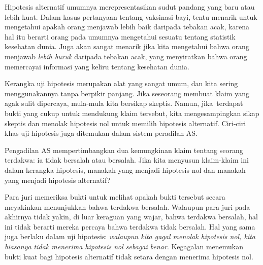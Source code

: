 Hipotesis alternatif umumnya merepresentasikan sudut pandang yang baru
atau lebih kuat. Dalam kasus pertanyaan
tentang vaksinasi bayi,
tentu menarik untuk mengetahui apakah
orang menjawab lebih baik daripada tebakan acak, karena hal itu
berarti orang pada umumnya mengetahui sesuatu tentang
statistik kesehatan dunia.
Juga akan sangat menarik jika kita mengetahui
bahwa orang menjawab \emph{lebih buruk} daripada tebakan acak,
yang menyiratkan bahwa orang memercayai
informasi yang keliru tentang kesehatan dunia.

Kerangka uji hipotesis merupakan alat yang sangat umum, dan kita sering menggunakannya tanpa berpikir panjang. Jika seseorang membuat klaim yang agak sulit dipercaya, mula-mula kita bersikap skeptis. Namun, jika~terdapat bukti yang cukup untuk mendukung klaim tersebut, kita mengesampingkan sikap skeptis dan menolak hipotesis nol untuk memilih hipotesis alternatif. Ciri-ciri khas uji hipotesis juga ditemukan dalam sistem peradilan AS. 


\begin{exercisewrap}
\begin{nexercise} \label{hypTestCourtExample}
Pengadilan AS mempertimbangkan dua kemungkinan klaim tentang seorang terdakwa: ia tidak bersalah atau bersalah. Jika kita menyusun klaim-klaim ini dalam kerangka hipotesis, manakah yang menjadi hipotesis nol dan manakah yang menjadi hipotesis alternatif?\footnotemark
\end{nexercise}
\end{exercisewrap}

Para juri memeriksa bukti untuk melihat apakah bukti tersebut secara meyakinkan
menunjukkan bahwa terdakwa bersalah.
Walaupun para juri pada akhirnya tidak yakin, di luar keraguan yang wajar,
bahwa terdakwa bersalah, hal ini tidak berarti mereka percaya bahwa
terdakwa tidak bersalah.
Hal yang sama juga berlaku dalam uji hipotesis:
\emph{walaupun kita gagal menolak hipotesis nol,
kita biasanya tidak menerima hipotesis nol sebagai benar}.
Kegagalan menemukan bukti kuat bagi hipotesis
alternatif tidak setara dengan menerima
hipotesis nol.

